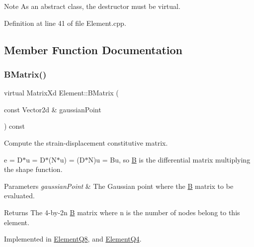 \begin{DoxyNote}{Note}
As an abstract class, the destructor must be virtual. 
\end{DoxyNote}


Definition at line 41 of file Element.\+cpp.



\subsection{Member Function Documentation}
\mbox{\label{class_element_ae3c88315d1a30addff6379a9089465ca}} 
\subsubsection{\texorpdfstring{B\+Matrix()}{BMatrix()}}
{\footnotesize\ttfamily virtual Matrix\+Xd Element\+::\+B\+Matrix (\begin{DoxyParamCaption}\item[{const Vector2d \&}]{gaussian\+Point }\end{DoxyParamCaption}) const\hspace{0.3cm}{\ttfamily [pure virtual]}}



Compute the strain-\/displacement constitutive matrix. 

e = D$\ast$u = D$\ast$(N$\ast$u) = (D$\ast$N)u = Bu, so \mbox{\hyperlink{class_b}{B}} is the differential matrix multiplying the shape function.


\begin{DoxyParams}{Parameters}
{\em gaussian\+Point} & The Gaussian point where the \mbox{\hyperlink{class_b}{B}} matrix to be evaluated. \\
\hline
\end{DoxyParams}
\begin{DoxyReturn}{Returns}
The 4-\/by-\/2n \mbox{\hyperlink{class_b}{B}} matrix where n is the number of nodes belong to this element. 
\end{DoxyReturn}


Implemented in \mbox{\hyperlink{class_element_q8_afb41facf96d5bb4be5162724699e3e02}{Element\+Q8}}, and \mbox{\hyperlink{class_element_q4_a092a9584a1b3b22cd929246ba100f91a}{Element\+Q4}}.

\mbox{\label{class_element_abd9d11d211f4f5e6f9e213a1013f36ed}} 
